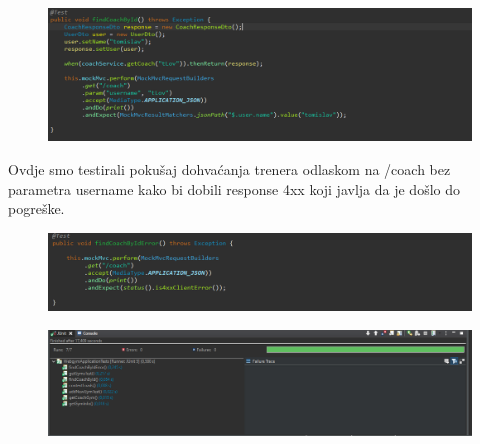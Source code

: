 			\begin{figure}[H]
    			\hspace*{-1.5cm}
    			\includegraphics[scale=0.5]{slike/findCoachBy.PNG} %
    			\centering
    			\label{fig:promjene}
    	    \end{figure}
	

				
			\noindent {}
			
			 Ovdje smo testirali pokušaj dohvaćanja trenera odlaskom na /coach bez parametra username kako bi dobili response 4xx koji javlja da je došlo do pogreške.
			\begin{figure}[H]
    			\hspace*{-1.5cm}
    			\includegraphics[scale=0.5]{slike/findCoachByError.PNG} %
    			\centering
    			\label{fig:promjene}
    	    \end{figure}
	

				
			\noindent {}

			\begin{figure}[H]
    			\hspace*{-1.5cm}
    			\includegraphics[scale=0.5]{slike/rezultati.PNG} %
    			\centering
    			\label{fig:promjene}
    	    \end{figure}
	

